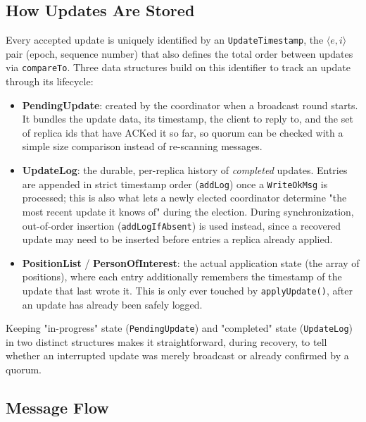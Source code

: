 \subsection{How Updates Are Stored}

Every accepted update is uniquely identified by an \texttt{UpdateTimestamp}, the $\langle e,i
\rangle$ pair (epoch, sequence number) that also defines the total order between updates via
\texttt{compareTo}. Three data structures build on this identifier to track an update through its
lifecycle:

\begin{itemize}[leftmargin=*]
  \item \textbf{PendingUpdate}: created by the coordinator when a broadcast round starts. It bundles
  the update data, its timestamp, the client to reply to, and the set of replica ids that have ACKed
  it so far, so quorum can be checked with a simple size comparison instead of re-scanning messages.
  \item \textbf{UpdateLog}: the durable, per-replica history of \emph{completed} updates. Entries are
  appended in strict timestamp order (\texttt{addLog}) once a \texttt{WriteOkMsg} is processed; this
  is also what lets a newly elected coordinator determine "the most recent update it knows of" during
  the election. During synchronization, out-of-order insertion (\texttt{addLogIfAbsent}) is used
  instead, since a recovered update may need to be inserted before entries a replica already applied.
  \item \textbf{PositionList} / \textbf{PersonOfInterest}: the actual application state (the array of
  positions), where each entry additionally remembers the timestamp of the update that last wrote it.
  This is only ever touched by \texttt{applyUpdate()}, after an update has already been safely logged.
\end{itemize}

Keeping "in-progress" state (\texttt{PendingUpdate}) and "completed" state (\texttt{UpdateLog}) in
two distinct structures makes it straightforward, during recovery, to tell whether an interrupted
update was merely broadcast or already confirmed by a quorum.

\subsection{Message Flow}

